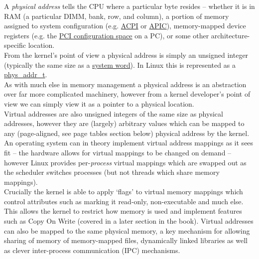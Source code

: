 A \emph{physical address}  tells the CPU where a
particular byte resides -- whether it is in RAM (a particular DIMM, bank, row,
and column), a portion of memory assigned to system configuration
(e.g. \href{https://en.wikipedia.org/wiki/Advanced_Configuration_and_Power_Interface}{ACPI}
or
\href{https://en.wikipedia.org/wiki/Advanced_Programmable_Interrupt_Controller}{APIC}),
memory-mapped device registers (e.g. the
\href{https://en.wikipedia.org/wiki/PCI_configuration_space}{PCI configuration
  space} on a PC), or some other architecture-specific location.\\

From the kernel's point of view a physical address is simply an unsigned integer
(typically the same size as a
\href{https://en.wikipedia.org/wiki/Word_(computer_architecture)}{system
  word}). In Linux this is represented as a
\href{https://git.kernel.org/pub/scm/linux/kernel/git/torvalds/linux.git/tree/include/linux/types.h?h=v5.17-rc7#n153}{phys\_addr\_t}.\\

As with much else in memory management a physical address is an abstraction over
far more complicated machinery, however from a kernel developer's point of view
we can simply view it as a pointer to a physical location.\\

Virtual addresses  are also unsigned integers of the same
size as physical addresses, however they are (largely) arbitrary values which
can be mapped to any (page-aligned, see page tables section below) physical
address by the kernel.\\

An operating system can in theory implement virtual address mappings as it sees
fit -- the hardware allows for virtual mappings to be changed on demand -- however
Linux provides per-\emph{process} virtual mappings which are swapped out as the
scheduler switches processes (but not threads which share memory mappings).\\

Crucially the kernel is able to apply `flags' to virtual memory mappings which
control attributes such as marking it read-only, non-executable and much
else. This allows the kernel to restrict how memory is used and implement
features such as Copy On Write (covered in a later section in the book). Virtual
addresses can also be mapped to the same physical memory, a key mechanism for
allowing sharing of memory of memory-mapped files, dynamically linked libraries
as well as clever inter-process communication (IPC) mechanisms.\\

